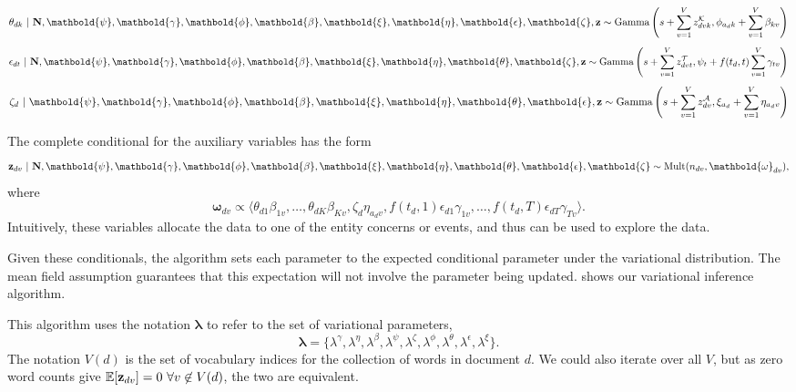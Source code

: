 \begin{equation}
\theta_{dk} \g \mathbf{N}, \mathbold{\psi}, \mathbold{\gamma}, \mathbold{\phi}, \mathbold{\beta}, \mathbold{\xi}, \mathbold{\eta}, \mathbold{\epsilon}, \mathbold{\zeta}, \mathbf{z} \sim
	\mbox{Gamma}\left(
		s + \sum_{v=1}^V z^\mathcal{K}_{dvk},
		\phi_{a_d k} + \sum_{v=1}^V \beta_{kv}
	\right)
\label{eq:theta}
\end{equation}
\begin{equation}
\epsilon_{dt} \g \mathbf{N}, \mathbold{\psi}, \mathbold{\gamma}, \mathbold{\phi}, \mathbold{\beta}, \mathbold{\xi}, \mathbold{\eta}, \mathbold{\theta}, \mathbold{\zeta}, \mathbf{z} \sim
	\mbox{Gamma}\left(
		s + \sum_{v=1}^V z^\mathcal{T}_{dvt},
		\psi_t + f(t_d, t) \sum_{v=1}^V \gamma_{tv}
	\right)
\label{eq:epsilon}
\end{equation}
\begin{equation}
\zeta_{d} \g \mathbold{\psi}, \mathbold{\gamma}, \mathbold{\phi}, \mathbold{\beta}, \mathbold{\xi}, \mathbold{\eta}, \mathbold{\theta}, \mathbold{\epsilon}, \mathbf{z} \sim
	\mbox{Gamma}\left(
		s + \sum_{v=1}^V z^\mathcal{A}_{dv},
		\xi_{a_d} + \sum_{v=1}^V \eta_{a_d v}
	\right)
\label{eq:zeta}
\end{equation}

The complete conditional for the auxiliary variables has the form
\[\mathbf{z}_{dv} \g \mathbf{N}, \mathbold{\psi}, \mathbold{\gamma}, \mathbold{\phi}, \mathbold{\beta}, \mathbold{\xi}, \mathbold{\eta}, \mathbold{\theta}, \mathbold{\epsilon}, \mathbold{\zeta} \sim \mbox{Mult}(n_{dv}, \mathbold{\omega}_{dv}),\] where
\begin{equation}
\mathbold{\omega}_{dv} \propto \langle
\theta_{d1} \beta_{1v}, \dots, \theta_{dK} \beta_{Kv}, \zeta_d \eta_{a_d v},
f(t_d, 1) \epsilon_{d1} \gamma_{1v}, \dots, f(t_d, T) \epsilon_{dT} \gamma_{Tv}\rangle.
\label{eq:omega}
\end{equation}
Intuitively, these variables allocate the data to one of the entity concerns or events, and thus can be used to explore the data.

Given these conditionals, the algorithm sets each parameter to the expected conditional parameter under the variational distribution. The mean field assumption guarantees that this expectation will not involve the parameter being updated.   shows our variational inference algorithm.

This algorithm uses the notation $\mathbold{\lambda}$ to refer to the set of variational parameters,
\[\mathbold{\lambda} = \{\lambda^\gamma, \lambda^\eta, \lambda^\beta, \lambda^\psi, \lambda^\zeta, \lambda^\phi, \lambda^\theta, \lambda^\epsilon, \lambda^\xi\}.\] The notation $V(d)$ is the set of vocabulary indices for the collection of words in document $d$.  We could also iterate over all $V$, but as zero word counts give $\mathbb{E}[\mathbf{z}_{dv}] = 0~\forall v \not\in V(d)$, the two are equivalent.

